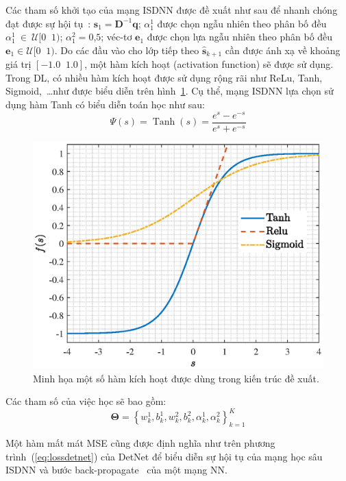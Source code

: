 Các tham số khởi tạo của mạng ISDNN được đề xuất như sau để nhanh chóng đạt được sự hội tụ~\cite{Narasimhan2014}: $\hat{\mathbf{s}}_1 = \mathbf{D}^{-1}\mathbf{q}$; $\alpha^1_1$ được chọn ngẫu nhiên theo phân bố đều $\alpha^1_1~\in~\mathcal{U}[0 \;\; 1)$; $\alpha^2_1 = 0$,$5$; véc-tơ $\mathbf{e}_1$ được chọn lựa ngẫu nhiên theo phân bố đều $\mathbf{e}_1 \in  \mathcal{U}[0 \;\; 1)$. Do các đầu vào cho lớp tiếp theo $\hat{\mathbf{s}}_{k+1}$ cần được ánh xạ về khoảng giá trị $[-1.0 \;\; 1.0]$, một hàm kích hoạt (activation function) sẽ được sử dụng. Trong DL, có nhiều hàm kích hoạt được sử dụng rộng rãi như ReLu, Tanh, Sigmoid,~\ldots như được biểu diễn trên hình~\ref{fig:tanh}. Cụ thể, mạng ISDNN lựa chọn sử dụng hàm Tanh có biểu diễn toán học như sau:
\begin{equation}
    \Psi(s) = \operatorname{Tanh}(s) = \frac{e^s - e^{-s}}{e^s + e^{-s}}
\end{equation}
\begin{figure}[ht]
    \centering
    \includegraphics[width=.8\linewidth]{figures/tanh.eps}
    \caption{Minh họa một số hàm kích hoạt được dùng trong kiến trúc đề xuất.}
    \label{fig:tanh}
\end{figure}

Các tham số của việc học sẽ bao gồm:
\begin{equation}
\boldsymbol{\Theta}=\left\{w^1_{k}, b^1_{k}, w^2_{k}, b^2_{k}, \alpha^1_k, \alpha^2_k \right\}_{k=1}^K
\end{equation}

Một hàm mất mát MSE cũng được định nghĩa như trên phương trình~(\ref{eq:lossdetnet}) của DetNet để biểu diễn sự hội tụ của mạng học sâu ISDNN và bước back-propagate~\cite{LeCun2015} của một mạng NN.

